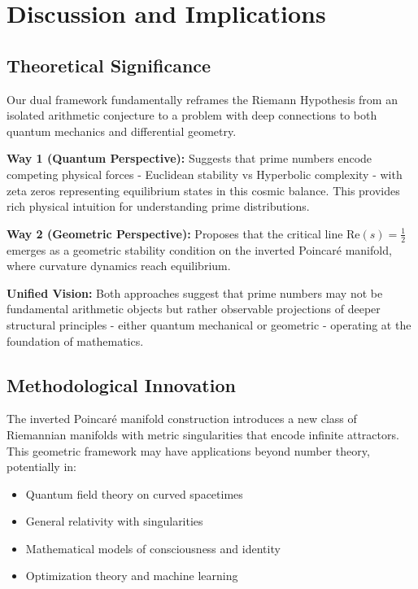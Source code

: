 \documentclass[12pt]{article}
\begin{document}
\section{Discussion and Implications}

\subsection{Theoretical Significance}

Our dual framework fundamentally reframes the Riemann Hypothesis from an isolated arithmetic conjecture to a problem with deep connections to both quantum mechanics and differential geometry.

\textbf{Way 1 (Quantum Perspective):} Suggests that prime numbers encode competing physical forces - Euclidean stability vs Hyperbolic complexity - with zeta zeros representing equilibrium states in this cosmic balance. This provides rich physical intuition for understanding prime distributions.

\textbf{Way 2 (Geometric Perspective):} Proposes that the critical line $\text{Re}(s) = \frac{1}{2}$ emerges as a geometric stability condition on the inverted Poincaré manifold, where curvature dynamics reach equilibrium.

\textbf{Unified Vision:} Both approaches suggest that prime numbers may not be fundamental arithmetic objects but rather observable projections of deeper structural principles - either quantum mechanical or geometric - operating at the foundation of mathematics.

\subsection{Methodological Innovation}

The inverted Poincar\'e manifold construction introduces a new class of Riemannian manifolds with metric singularities that encode infinite attractors. This geometric framework may have applications beyond number theory, potentially in:
\begin{itemize}
\item Quantum field theory on curved spacetimes
\item General relativity with singularities
\item Mathematical models of consciousness and identity
\item Optimization theory and machine learning
\end{itemize}
\end{document}
